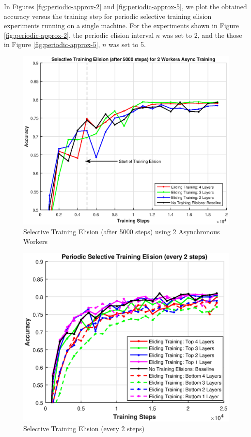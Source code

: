 In Figures \ref{fig:periodic-approx-2} and \ref{fig:periodic-approx-5}, we plot the obtained accuracy versus the training step for periodic selective training elision experiments running on a single machine. For the experiments shown in Figure \ref{fig:periodic-approx-2}, the periodic elision interval $n$ was set to 2, and the those in Figure \ref{fig:periodic-approx-5}, $n$ was set to 5. 


\begin{figure}[t]
	\centering
	\includegraphics[width=0.8\columnwidth]{figures/approx-2workers.eps}
	\caption{Selective Training Elision (after 5000 steps) using 2 Asynchronous Workers}
	\label{fig:approx-2-workers}
\end{figure}

\begin{figure}[t]
	\centering
	\includegraphics[width=0.8\columnwidth]{figures/combined_bottom_top_elisions.eps}
	\caption{Selective Training Elision (every 2 steps)}
	\label{fig:combined-alt}
\end{figure}
